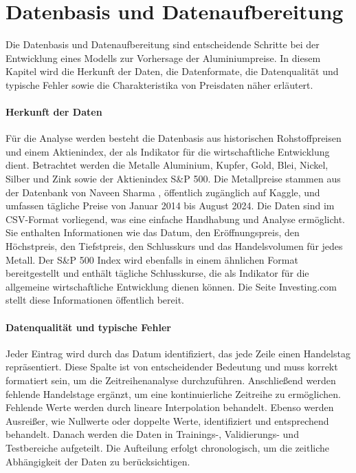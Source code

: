 \section{Datenbasis und Datenaufbereitung}
\label{sec:datenbasis_und_datenaufbereitung}

Die Datenbasis und Datenaufbereitung sind entscheidende Schritte bei der Entwicklung eines Modells zur Vorhersage der Aluminiumpreise. In diesem Kapitel wird die Herkunft der Daten, die Datenformate, die Datenqualität und typische Fehler sowie die Charakteristika von Preisdaten näher erläutert.

\paragraph{Herkunft der Daten}
Für die Analyse werden besteht die Datenbasis aus historischen Rohstoffpreisen und einem Aktienindex, der als Indikator für die wirtschaftliche Entwicklung dient. Betrachtet werden die Metalle Aluminium, Kupfer, Gold, Blei, Nickel, Silber und Zink sowie der Aktienindex S\&P 500. Die Metallpreise stammen aus der Datenbank von Naveen Sharma \cite{naveennas_metal_price_prediction_2024}, öffentlich zugänglich auf Kaggle, und umfassen tägliche Preise von Januar 2014 bis August 2024. Die Daten sind im CSV-Format vorliegend, was eine einfache Handhabung und Analyse ermöglicht. Sie enthalten Informationen wie das Datum, den Eröffnungspreis, den Höchstpreis, den Tiefstpreis, den Schlusskurs und das Handelsvolumen für jedes Metall. Der S\&P 500 Index wird ebenfalls in einem ähnlichen Format bereitgestellt und enthält tägliche Schlusskurse, die als Indikator für die allgemeine wirtschaftliche Entwicklung dienen können. Die Seite Investing.com \cite{investing_sp500_historical_2026} stellt diese Informationen öffentlich bereit.

\paragraph{Datenqualität und typische Fehler}
Jeder Eintrag wird durch das Datum identifiziert, das jede Zeile einen Handelstag repräsentiert. Diese Spalte ist von entscheidender Bedeutung und muss korrekt formatiert sein, um die Zeitreihenanalyse durchzuführen. Anschließend werden fehlende Handelstage ergänzt, um eine kontinuierliche Zeitreihe zu ermöglichen. Fehlende Werte werden durch lineare Interpolation behandelt. Ebenso werden Ausreißer, wie Nullwerte oder doppelte Werte, identifiziert und entsprechend behandelt. Danach werden die Daten in Trainings-, Validierungs- und Testbereiche aufgeteilt. Die Aufteilung erfolgt chronologisch, um die zeitliche Abhängigkeit der Daten zu berücksichtigen. 

